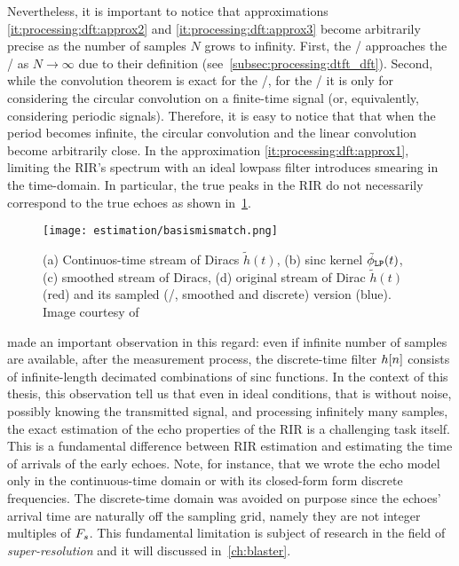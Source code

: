 Nevertheless, it is important to notice that approximations \ref{it:processing:dft:approx2} and \ref{it:processing:dft:approx3} become arbitrarily precise as the number of samples $N$ grows to infinity.
First, the \DFT/ approaches the \DTFT/ as $N\to\infty$ due to their definition (see~\cref{subsec:processing:dtft_dft}).
Second, while the convolution theorem is exact for the \DTFT/, for the \DFT/ it is only for  considering the circular convolution on a finite-time signal (or, equivalently, considering periodic signals).
Therefore, it is easy to notice that that when the period becomes infinite, the circular convolution and the linear convolution become arbitrarily close.
In the approximation \ref{it:processing:dft:approx1}, limiting the \ac{RIR}'s spectrum with an ideal lowpass filter introduces smearing in the time-domain.
In particular, the true peaks in the \ac{RIR} do not necessarily correspond to the true echoes as shown in~\cref{fig:processing:mismatch}.
\begin{figure}[h]
    \begin{fullwidth}
        \centering
        \texttt{[image: estimation/basismismatch.png]}
        \caption{%
        (a) Continuos-time stream of Diracs $\tilde{h}(t)$,
        (b) sinc kernel $\lowpassfilter(t)$,
        (c) smoothed stream of Diracs,
        (d) original stream of Dirac $\tilde{h}(t)$ (red) and its sampled (\ie/, smoothed and discrete) version (blue).
        Image courtesy of~
        }
        \label{fig:processing:mismatch}
    \end{fullwidth}
\end{figure}
\citeauthor{tukuljac2018mulan} made an important observation in this regard:
even if infinite number of samples are available, after the measurement process, the discrete-time filter ${h}[n]$ consists of infinite-length decimated combinations of sinc functions.
In the context of this thesis, this observation tell us that even in ideal conditions, that is without noise, possibly knowing the transmitted signal, and processing infinitely many samples, the exact estimation of the echo properties of the \ac{RIR} is a challenging task itself.
This is a fundamental difference between \ac{RIR} estimation and estimating the time of arrivals of the early echoes.
Note, for instance, that we wrote the echo model only in the continuous-time domain or with its closed-form form discrete frequencies.
The discrete-time domain was avoided on purpose since the echoes' arrival time are naturally off the sampling grid, namely they are not integer multiples of $F_s$.
This fundamental limitation is subject of research in the field of \textit{super-resolution} and it will discussed in~\cref{ch:blaster}.

